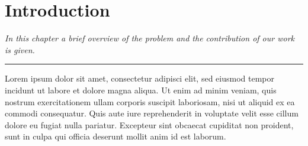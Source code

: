 \chapter{Introduction}\label{ch:intro}

\textit{In this chapter a brief overview of the problem and the contribution of our work  is given.}

\par\fancybreak{$***$}\par
\vspace{0.35cm} 

Lorem ipsum dolor sit amet, consectetur adipisci elit, sed eiusmod tempor incidunt ut labore et dolore magna aliqua. Ut enim ad minim veniam, quis nostrum exercitationem ullam corporis suscipit laboriosam, nisi ut aliquid ex ea commodi consequatur. Quis aute iure reprehenderit in voluptate velit esse cillum dolore eu fugiat nulla pariatur. Excepteur sint obcaecat cupiditat non proident, sunt in culpa qui officia deserunt mollit anim id est laborum.

